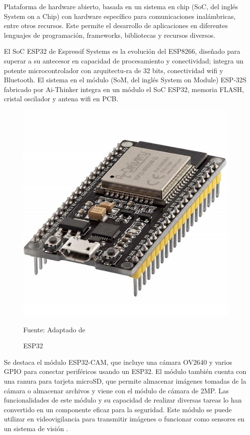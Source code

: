 Plataforma de  hardware  abierto, basada   en   un   sistema  en  chip  (SoC,  del  inglés  System on  a  Chip) con hardware específico para comunicaciones inalámbricas, entre otros recursos. Este  permite  el  desarrollo  de  aplicaciones  en  diferentes  lenguajes  de  programación,  frameworks, bibliotecas  y  recursos  diversos.

El  SoC  ESP32  de  Espressif  Systems  es  la  evolución  del  ESP8266,  diseñado  para  superar  a  su  antecesor  en  capacidad  de  procesamiento  y  conectividad;  integra  un  potente  microcontrolador  con  arquitectu-ra de 32 bits, conectividad wifi y Bluetooth. El  sistema  en  el  módulo  (SoM,  del  inglés  System  on  Module)  ESP-32S  fabricado  por  Ai-Thinker  integra  en  un  módulo  el  SoC  ESP32, memoria FLASH, cristal oscilador y antena wifi en PCB.

\begin{figure}[htb]
    \centering
    \includegraphics[scale = 0.50]{Imagenes/esp32cam.jpg}
    \caption{ESP32}{Fuente: Adaptado de ~\cite{delivery}}
\end{figure}

Se destaca el módulo ESP32-CAM, que incluye una cámara OV2640 y varios GPIO para conectar periféricos usando un ESP32. El módulo también cuenta con una ranura para tarjeta microSD, que permite almacenar imágenes tomadas de la cámara o almacenar archivos y viene con el módulo de cámara de 2MP. Las funcionalidades de este módulo y su capacidad de realizar diversas tareas lo han convertido en un componente eficaz para la seguridad. Este módulo se puede utilizar en videovigilancia para transmitir imágenes o funcionar como sensores en un sistema de visión \cite{salvador}.

